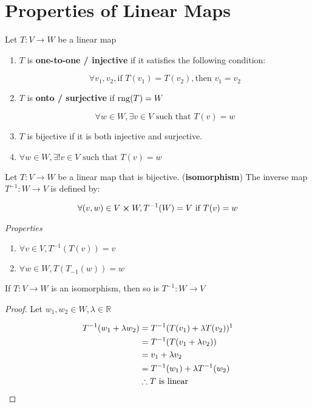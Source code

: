 \section{Properties of Linear Maps}

\begin{definition}
	Let $T:V \to W$ be a linear map

	\begin{enumerate}
		\item $T$ is \textbf{one-to-one / injective} if it satisfies the following condition:
		
		\[\forall v_1, v_2, \text{if } T(v_1) = T(v_2), \text{then } v_1 = v_2\]

		\item $T$ is \textbf{onto / surjective} if $\mathrm{rng}(T) = W$

		\[\forall w \in W, \exists v \in V \text{ such that } T(v) = w\]

		\item $T$ is bijective if it is both injective and surjective.
		\item $\forall w \in W, \exists ! v \in V \text{ such that } T(v) = w$
	\end{enumerate}
\end{definition}

\begin{definition}
	Let $T:V \to W$ be a linear map that is bijective. (\textbf{isomorphism}) The inverse map $T^{-1}: W \to V$ is defined by:

	\[\forall (v, w) \in V \cross W, T^{-1}(W) = V \text{ if } T(v) = w\]

	\textit{Properties}

	\begin{enumerate}
		\item $\forall v \in V, T^{-1}\left(T(v)\right) = v$
		\item $\forall w \in W, T\left(T_{-1}(w)\right) = w$
	\end{enumerate}
\end{definition}

\begin{theorem}
	If $T:V \to W$ is an isomorphism, then so is $T^{-1}:W \to V$
\end{theorem}

\begin{proof}
	Let $w_1, w_2 \in W, \lambda \in \mathbb{R}$

	\begin{align*}
		T^{-1}(w_1 + \lambda w_2) &= T^{-1}(T(v_1) + \lambda T(v_2))\footnotemark\\
		&= T^{-1}(T(v_1 + \lambda v_2))\\
		&= v_1 + \lambda v_2\\
		&= T^{-1}(w_1) + \lambda T^{-1}(w_2)\\
		&\therefore T \text{ is linear}
	\end{align*}
\end{proof}

